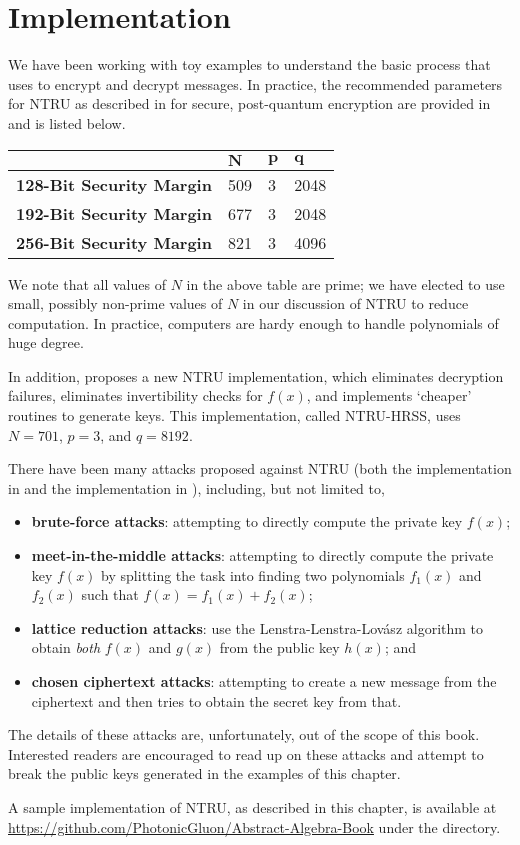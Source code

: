 \newpage

\section{Implementation}
We have been working with toy examples to understand the basic process that \cite{hoffstein_pipher_silverman_1998} uses to encrypt and decrypt messages. In practice, the recommended parameters for NTRU as described in \cite{hoffstein_pipher_silverman_1998} for secure, post-quantum encryption are provided in \cite{ntru_2020} and is listed below.
\begin{table}[H]
    \centering
    \begin{tabular}{|l|l|l|l|}
        \hline
        & $\boldsymbol{N}$ & $\boldsymbol{p}$ & $\boldsymbol{q}$ \\ \hline
        \textbf{128-Bit Security Margin} & 509 & 3 & 2048 \\ \hline
        \textbf{192-Bit Security Margin} & 677 & 3 & 2048 \\ \hline
        \textbf{256-Bit Security Margin} & 821 & 3 & 4096 \\ \hline
    \end{tabular}
\end{table}

We note that all values of $N$ in the above table are prime; we have elected to use small, possibly non-prime values of $N$ in our discussion of NTRU to reduce computation. In practice, computers are hardy enough to handle polynomials of huge degree.

In addition, \cite{hulsing_rijneveld_schanck_schwabe_2018} proposes a new NTRU implementation, which eliminates decryption failures, eliminates invertibility checks for $f(x)$, and implements `cheaper' routines to generate keys. This implementation, called NTRU-HRSS, uses $N = 701$, $p = 3$, and $q = 8192$.

There have been many attacks proposed against NTRU (both the implementation in \cite{hoffstein_pipher_silverman_1996} and the implementation in \cite{hulsing_rijneveld_schanck_schwabe_2018}), including, but not limited to,
\begin{itemize}
    \item \textbf{brute-force attacks}: attempting to directly compute the private key $f(x)$;
    \item \textbf{meet-in-the-middle attacks}: attempting to directly compute the private key $f(x)$ by splitting the task into finding two polynomials $f_1(x)$ and $f_2(x)$ such that $f(x) = f_1(x) + f_2(x)$;
    \item \textbf{lattice reduction attacks}: use the Lenstra-Lenstra-Lov\'asz algorithm to obtain \textit{both} $f(x)$ and $g(x)$ from the public key $h(x)$; and
    \item \textbf{chosen ciphertext attacks}: attempting to create a new message from the ciphertext and then tries to obtain the secret key from that.
\end{itemize}
The details of these attacks are, unfortunately, out of the scope of this book. Interested readers are encouraged to read up on these attacks and attempt to break the public keys generated in the examples of this chapter.

A sample implementation of NTRU, as described in this chapter, is available at \url{https://github.com/PhotonicGluon/Abstract-Algebra-Book} under the  directory.

